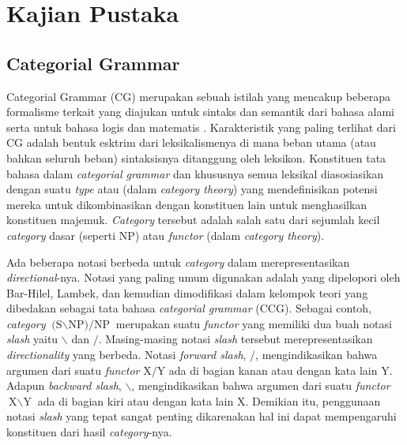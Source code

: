 \chapter{Kajian Pustaka}

\section{Categorial Grammar}
Categorial Grammar (CG) merupakan sebuah istilah yang mencakup beberapa formalisme terkait yang diajukan
untuk sintaks dan semantik dari bahasa alami serta untuk bahasa logis dan matematis \cite{Steedman92catg}.
Karakteristik yang paling terlihat dari CG adalah bentuk esktrim dari leksikalismenya di mana beban utama
(atau bahkan seluruh beban) sintaksisnya ditanggung oleh leksikon.
Konstituen tata bahasa dalam \textit{categorial grammar} dan khususnya semua leksikal diasosiasikan
dengan suatu \textit{type} atau  (dalam \textit{category theory}) yang
mendefinisikan potensi mereka untuk dikombinasikan dengan konstituen lain untuk menghasilkan konstituen
majemuk.
\textit{Category} tersebut adalah salah satu dari sejumlah kecil \textit{category} dasar (seperti NP)
atau \textit{functor} (dalam \textit{category theory}).

Ada beberapa notasi berbeda untuk \textit{category} dalam merepresentasikan \textit{directional}-nya.
Notasi yang paling umum digunakan adalah  yang dipelopori oleh Bar-Hilel,
Lambek, dan kemudian dimodifikasi dalam kelompok teori yang dibedakan sebagai tata bahasa
 \textit{categorial grammar} (CCG).
Sebagai contoh, \textit{category} $\text{(S$\backslash$NP)/NP}$ merupakan suatu \textit{functor} yang
memiliki dua buah notasi \textit{slash} yaitu $\backslash$ dan $/$.
Masing-masing notasi \textit{slash} tersebut merepresentasikan \textit{directionality} yang berbeda.
Notasi \textit{forward slash}, $/$, mengindikasikan bahwa argumen dari suatu \textit{functor}
$\text{X}/\text{Y}$ ada di bagian kanan atau dengan kata lain $\text{Y}$.
Adapun \textit{backward slash}, $\backslash$, mengindikasikan bahwa argumen dari suatu \textit{functor}
$\text{X}\backslash\text{Y}$ ada di bagian kiri atau dengan kata lain $\text{X}$.
Demikian itu, penggunaan notasi \textit{slash} yang tepat sangat penting dikarenakan hal ini dapat
mempengaruhi konstituen dari hasil  \textit{category}-nya.

